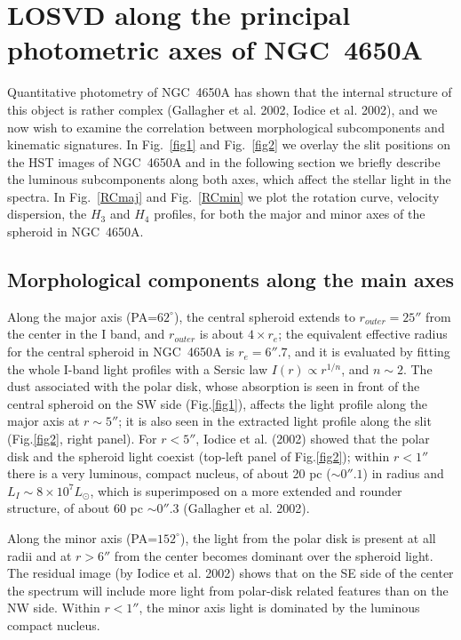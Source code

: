 \documentclass[12pt,preprint]{aastex}
\begin{document}

\section{LOSVD along the principal photometric axes of NGC~4650A}\label{result}

Quantitative photometry of NGC~4650A has shown that the internal
structure of this object is rather complex (Gallagher et al. 2002,
Iodice et al. 2002), and we now wish to examine the correlation
between morphological subcomponents and kinematic signatures. In
Fig.~\ref{fig1} and Fig.~\ref{fig2} we overlay the slit positions on
the HST images of NGC~4650A and in the following section we briefly
describe the luminous subcomponents along both axes, which affect the
stellar light in the spectra. In Fig.~\ref{RCmaj} and Fig.~\ref{RCmin}
we plot the rotation curve, velocity dispersion, the $H_3$ and $H_4$
profiles, for both the major and minor axes of the spheroid in
NGC~4650A.

\subsection{Morphological components along the main axes}\label{phot}

Along the major axis (PA=$62^\circ$), the central spheroid extends to
$r_{outer} = 25''$ from the center in the I band, and $r_{outer}$ is
about $4 \times r_e$; the equivalent effective radius for the central
spheroid in NGC~4650A is $r_e = 6''.7$, and it is evaluated by fitting
the whole I-band light profiles with a Sersic law $I(r) \propto
r^{1/n}$, and $n \sim 2$.  The dust associated with the polar disk,
whose absorption is seen in front of the central spheroid on the SW
side (Fig.\ref{fig1}), affects the light profile along the major
axis at $r \sim 5''$; it is also seen in the extracted light profile
along the slit (Fig.\ref{fig2}, right panel).  For
$r < 5''$, Iodice et al. (2002) showed that the polar disk and the
spheroid light coexist (top-left panel of Fig.\ref{fig2});
within $r<1''$ there is a very luminous, compact nucleus, of about
20 pc ($\sim 0''.1$) in radius and $L_I \sim 8 \times 10^7 L_{\odot}$,
which is superimposed on a more extended and rounder structure, of
about 60 pc $\sim 0''.3$ (Gallagher et al. 2002).

Along the minor axis (PA=$152^\circ$), the light from the polar disk
is present at all radii and at $r > 6''$ from the center becomes
dominant over the spheroid light.  The residual image (by Iodice et
al. 2002) shows that on the SE side of the center the spectrum will
include more light from polar-disk related features than on the NW
side. Within $r < 1''$, the minor axis light is dominated by the
luminous compact nucleus.
\end{document}
